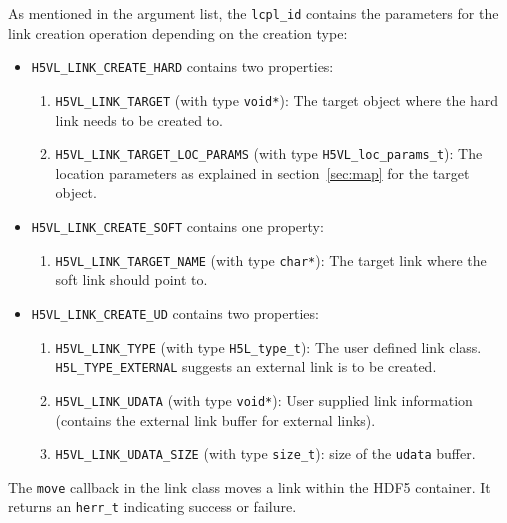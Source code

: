As mentioned in the argument list, the \texttt{lcpl\_id} contains the
parameters for the link creation operation depending on the creation
type:
\begin{itemize}
\item \texttt{H5VL\_LINK\_CREATE\_HARD} contains two properties:
  \begin{enumerate}
  \item \texttt{H5VL\_LINK\_TARGET} (with type \texttt{void*}): The target
    object where the hard link needs to be created to.
  \item \texttt{H5VL\_LINK\_TARGET\_LOC\_PARAMS} (with type \texttt{H5VL\_loc\_params\_t}): The location parameters as explained in
    section~\ref{sec:map} for the target object.
  \end{enumerate}

\item \texttt{H5VL\_LINK\_CREATE\_SOFT} contains one property:
  \begin{enumerate}
  \item \texttt{H5VL\_LINK\_TARGET\_NAME} (with type \texttt{char*}): The target
    link where the soft link should point to.
  \end{enumerate}

\item \texttt{H5VL\_LINK\_CREATE\_UD} contains two properties:
  \begin{enumerate}
  \item \texttt{H5VL\_LINK\_TYPE} (with type \texttt{H5L\_type\_t}): The
    user defined link class. \texttt{H5L\_TYPE\_EXTERNAL} suggests an
    external link is to be created.
  \item \texttt{H5VL\_LINK\_UDATA} (with type \texttt{void*}): User supplied
    link information (contains the external link buffer for external
    links). 
  \item \texttt{H5VL\_LINK\_UDATA\_SIZE} (with type \texttt{size\_t}): size
    of the \texttt{udata} buffer. 
  \end{enumerate}
\end{itemize}

The \texttt{move} callback in the link class moves a link within the HDF5 container. It returns an \texttt{herr\_t} indicating success or failure.\bigskip

